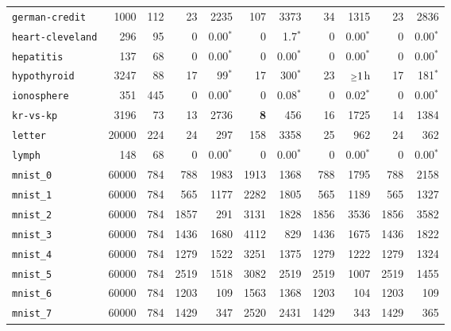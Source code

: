 \begin{tabular}{lccrrrrrrrr}
\texttt{german-credit} & \multicolumn{1}{r}{1000} & \multicolumn{1}{r}{112}  & 23 & 2235 & 107 & 3373 & 34 & 1315 & 23 & 2836\\
\texttt{heart-cleveland} & \multicolumn{1}{r}{296} & \multicolumn{1}{r}{95}  & 0 & 0.00$^*$ & 0 & 1.7$^*$ & 0 & 0.00$^*$ & 0 & 0.00$^*$\\
\texttt{hepatitis} & \multicolumn{1}{r}{137} & \multicolumn{1}{r}{68}  & 0 & 0.00$^*$ & 0 & 0.00$^*$ & 0 & 0.00$^*$ & 0 & 0.00$^*$\\
\texttt{hypothyroid} & \multicolumn{1}{r}{3247} & \multicolumn{1}{r}{88}  & 17 & 99$^*$ & 17 & 300$^*$ & 23 & $\mathsmaller{\geq}1$h & 17 & 181$^*$\\
\texttt{ionosphere} & \multicolumn{1}{r}{351} & \multicolumn{1}{r}{445}  & 0 & 0.00$^*$ & 0 & 0.08$^*$ & 0 & 0.02$^*$ & 0 & 0.00$^*$\\
\texttt{kr-vs-kp} & \multicolumn{1}{r}{3196} & \multicolumn{1}{r}{73}  & 13 & 2736 & \textbf{8} & 456 & 16 & 1725 & 14 & 1384\\
\texttt{letter} & \multicolumn{1}{r}{20000} & \multicolumn{1}{r}{224}  & 24 & 297 & 158 & 3358 & 25 & 962 & 24 & 362\\
\texttt{lymph} & \multicolumn{1}{r}{148} & \multicolumn{1}{r}{68}  & 0 & 0.00$^*$ & 0 & 0.00$^*$ & 0 & 0.00$^*$ & 0 & 0.00$^*$\\
\texttt{mnist\_0} & \multicolumn{1}{r}{60000} & \multicolumn{1}{r}{784}  & 788 & 1983 & 1913 & 1368 & 788 & 1795 & 788 & 2158\\
\texttt{mnist\_1} & \multicolumn{1}{r}{60000} & \multicolumn{1}{r}{784}  & 565 & 1177 & 2282 & 1805 & 565 & 1189 & 565 & 1327\\
\texttt{mnist\_2} & \multicolumn{1}{r}{60000} & \multicolumn{1}{r}{784}  & 1857 & 291 & 3131 & 1828 & 1856 & 3536 & 1856 & 3582\\
\texttt{mnist\_3} & \multicolumn{1}{r}{60000} & \multicolumn{1}{r}{784}  & 1436 & 1680 & 4112 & 829 & 1436 & 1675 & 1436 & 1822\\
\texttt{mnist\_4} & \multicolumn{1}{r}{60000} & \multicolumn{1}{r}{784}  & 1279 & 1522 & 3251 & 1375 & 1279 & 1222 & 1279 & 1324\\
\texttt{mnist\_5} & \multicolumn{1}{r}{60000} & \multicolumn{1}{r}{784}  & 2519 & 1518 & 3082 & 2519 & 2519 & 1007 & 2519 & 1455\\
\texttt{mnist\_6} & \multicolumn{1}{r}{60000} & \multicolumn{1}{r}{784}  & 1203 & 109 & 1563 & 1368 & 1203 & 104 & 1203 & 109\\
\texttt{mnist\_7} & \multicolumn{1}{r}{60000} & \multicolumn{1}{r}{784}  & 1429 & 347 & 2520 & 2431 & 1429 & 343 & 1429 & 365\\

\end{tabular}
